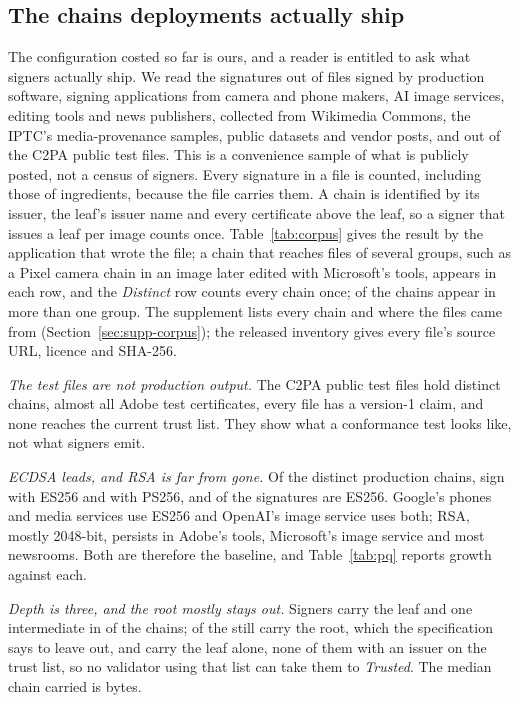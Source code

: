 \subsection{The chains deployments actually ship}
\label{sec:prodchains}

The configuration costed so far is ours, and a reader is entitled to ask what
signers actually ship. We read the signatures out of \NcorpProdAssets{} files
signed by production software, \NcorpProdGens{} signing applications from
camera and phone makers, AI image services, editing tools and news
publishers, collected from Wikimedia Commons, the IPTC's media-provenance samples, public datasets and vendor posts, and out of the C2PA public test files. This is a convenience sample of what is publicly posted, not a census of signers. Every signature in a file is counted, including those of ingredients, because the file carries them. A chain is identified by its issuer, the leaf's issuer name and every certificate above the leaf, so a signer that issues a leaf per image counts once. Table~\ref{tab:corpus} gives the result by the application that wrote the file; a chain that reaches files of several groups, such as a Pixel camera chain in an image later edited with Microsoft's tools, appears in each row, and the \emph{Distinct} row counts every chain once; \NcorpMultiGroup{} of the \NcorpProdChains{} chains appear in more than one group. The supplement lists every chain and where the files came from (Section~\ref{sec:supp-corpus}); the released inventory gives every file's source URL, licence and SHA-256.



\emph{The test files are not production output.} The C2PA public test files
hold \NcorpTestChains{}
distinct chains, almost all Adobe test certificates, every file has a
version-1 claim, and none reaches the current trust list. They show what a
conformance test looks like, not what signers emit.

\emph{ECDSA leads, and RSA is far from gone.} Of the
\NcorpProdChains{} distinct production chains, \NcorpProdEs{} sign with ES256
and \NcorpProdPs{} with PS256, and \NcorpProdSigEs{} of the
\NcorpProdSigs{} signatures are ES256. Google's phones and media services use
ES256 and OpenAI's image service uses both; RSA, mostly 2048-bit, persists in
Adobe's tools, Microsoft's image service and most newsrooms. Both are
therefore the baseline, and Table~\ref{tab:pq} reports growth against each.

\emph{Depth is three, and the root mostly stays out.} Signers carry the leaf and one intermediate in \NcorpProdTwoCert{} of the \NcorpProdChains{} chains; \NcorpProdRoot{} of the
\NcorpProdChains{} still carry the root, which the specification says to
leave out, and \NcorpProdOneCert{} carry the leaf alone, none of them with an
issuer on the trust list, so no validator using that list can take them to
\emph{Trusted}. The median chain carried is \NcorpProdChainMed{}
bytes.

